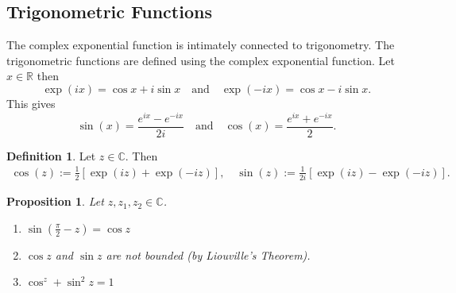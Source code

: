 \documentclass[12pt,openany]{book}
\newtheorem{proposition}[theorem]{Proposition}
\theoremstyle{definition}
\newtheorem{definition}{Definition}[chapter]
\newcommand{\R}{\mathbb{R}}
\newcommand{\C}{\mathbb{C}}
\newcommand{\of}[1]{\left( #1 \right)}
\begin{document}
	\subsection{Trigonometric Functions}
	The complex exponential function is intimately connected to trigonometry. The trigonometric functions are defined using the complex exponential function. Let $x\in\R$ then \[
	\exp\of{ix}=\cos x+i\sin x\quad\text{and}\quad\exp\of{-ix}=\cos x-i\sin x.
	\] This gives \[
	\sin(x) = \frac{e^{ix} - e^{-ix}}{2i}\quad\text{and}\quad\cos(x) = \frac{e^{ix} + e^{-ix}}{2}.	
	\] 
	\vspace{8pt}
	\begin{tcolorbox}[colback=white,colframe=defcolor,arc=5pt,title={\color{white}\bf Complex Trigonometric}]
		\begin{definition}
			Let $z\in\C$. Then \begin{align*}
				\cos\of{z}:=\frac{1}{2}\left[\exp(iz)+\exp(-iz)\right],\quad
				\sin\of{z}:=\frac{1}{2i}\left[\exp(iz)-\exp(-iz)\right].
			\end{align*}
		\end{definition}
	\end{tcolorbox}
	\vspace{8pt}
	\begin{tcolorbox}[colback=white,colframe=procolor,arc=5pt,title={\color{white}\bf Properties of Complex Trigonometric}]
		\begin{proposition}
			Let $z,z_1,z_2\in\C$. \begin{enumerate}[(1)]
				\item $\sin\of{\frac{\pi}{2}-z}=\cos z$
				\item $\cos z$ and $\sin z$ are not bounded (by Liouville's Theorem).
				\item $\cos^z+\sin^2z=1$
			\end{enumerate}
		\end{proposition}
	\end{tcolorbox}
	\newpage
\end{document}
